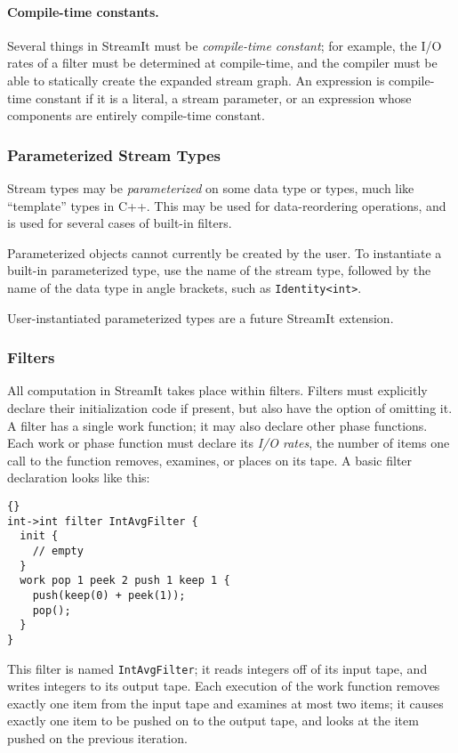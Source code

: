 \documentclass[11pt]{article}
\begin{document}
\paragraph{Compile-time constants.}  Several things in StreamIt must
be \emph{compile-time constant}; for example, the I/O rates of a
filter must be determined at compile-time, and the compiler must be
able to statically create the expanded stream graph.  An expression is
compile-time constant if it is a literal, a stream parameter, or an
expression whose components are entirely compile-time constant.

\subsubsection{Parameterized Stream Types}

Stream types may be \emph{parameterized} on some data type or types,
much like ``template'' types in C++.  This may be used for
data-reordering operations, and is used for several cases of built-in
filters.

Parameterized objects cannot currently be created by the user.  To
instantiate a built-in parameterized type, use the name of the stream
type, followed by the name of the data type in angle brackets, such as
\lstinline|Identity<int>|.

\begin{note}
User-instantiated parameterized types are a future StreamIt
extension.
\end{note}

\subsubsection{Filters}

All computation in StreamIt takes place within filters.  Filters must
explicitly declare their initialization code if present, but also have
the option of omitting it.  A filter has a single work function; it
may also declare other phase functions.  Each work or phase function
must declare its \emph{I/O rates}, the number of items one call to the
function removes, examines, or places on its tape.  A basic filter
declaration looks like this:

\begin{lstlisting}{}
int->int filter IntAvgFilter {
  init {
    // empty
  }
  work pop 1 peek 2 push 1 keep 1 {
    push(keep(0) + peek(1));
    pop();
  }
}
\end{lstlisting}

This filter is named \lstinline|IntAvgFilter|; it reads integers off
of its input tape, and writes integers to its output tape.  Each
execution of the work function removes exactly one item from the input
tape and examines at most two items; it causes exactly one item to be
pushed on to the output tape, and looks at the item pushed on the
previous iteration.
\end{document}

